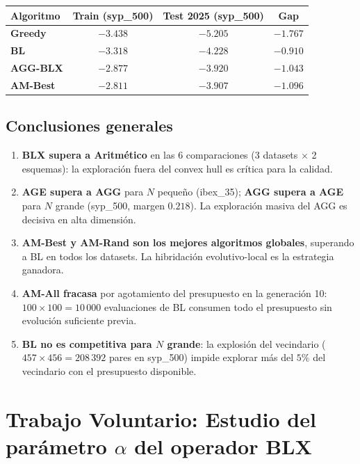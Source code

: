 \documentclass[12pt,a4paper]{article}
\begin{document}
\begin{center}
\begin{tabular}{lcc|c}
\toprule
\textbf{Algoritmo} & \textbf{Train (syp\_500)} & \textbf{Test 2025 (syp\_500)} & \textbf{Gap} \\
\midrule
\textbf{Greedy}   & $-3.438$ & $-5.205$ & $-1.767$ \\
\textbf{BL}       & $-3.318$ & $-4.228$ & $-0.910$ \\
\textbf{AGG-BLX}  & $-2.877$ & $-3.920$ & $-1.043$ \\
\textbf{AM-Best}  & $-2.811$ & $-3.907$ & $-1.096$ \\
\bottomrule
\end{tabular}
\end{center}

\subsection{Conclusiones generales}

\begin{enumerate}
  \item \textbf{BLX supera a Aritmético} en las 6 comparaciones (3 datasets $\times$
  2 esquemas): la exploración fuera del convex hull es crítica para la calidad.

  \item \textbf{AGE supera a AGG} para $N$ pequeño (ibex\_35); \textbf{AGG supera a AGE}
  para $N$ grande (syp\_500, margen $0.218$). La exploración masiva del AGG es decisiva
  en alta dimensión.

  \item \textbf{AM-Best y AM-Rand son los mejores algoritmos globales}, superando a BL
  en todos los datasets. La hibridación evolutivo-local es la estrategia ganadora.

  \item \textbf{AM-All fracasa} por agotamiento del presupuesto en la generación 10:
  $100 \times 100 = 10\,000$ evaluaciones de BL consumen todo el presupuesto sin
  evolución suficiente previa.

  \item \textbf{BL no es competitiva para $N$ grande}: la explosión del vecindario
  ($457 \times 456 = 208\,392$ pares en syp\_500) impide explorar más del $5\%$ del
  vecindario con el presupuesto disponible.
\end{enumerate}

\section{Trabajo Voluntario: Estudio del parámetro $\alpha$ del operador BLX}
\end{document}
